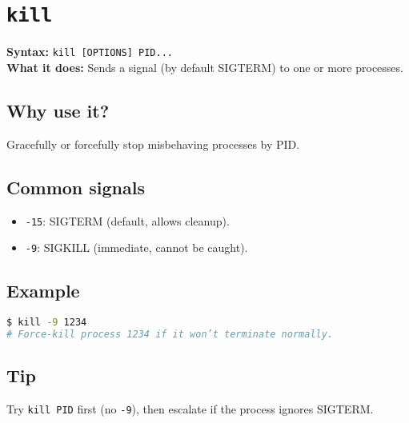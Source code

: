 \documentclass[10pt,oneside]{scrbook}
\begin{document}
\section{\texttt{kill}}
\begin{cmdbox}
  \textbf{Syntax:} \lstinline!kill [OPTIONS] PID...! \\
  \textbf{What it does:} Sends a signal (by default SIGTERM) to one or more processes.
\end{cmdbox}
\begin{commanddetails}
  \subsection*{Why use it?}
    Gracefully or forcefully stop misbehaving processes by PID.

  \subsection*{Common signals}
    \begin{itemize}
      \item \lstinline!-15!: SIGTERM (default, allows cleanup).  
      \item \lstinline!-9!: SIGKILL (immediate, cannot be caught).
    \end{itemize}

  \subsection*{Example}
  \begin{lstlisting}[language=bash]
$ kill -9 1234
# Force-kill process 1234 if it won’t terminate normally.
  \end{lstlisting}

  \subsection*{Tip}
    Try \lstinline!kill PID! first (no \lstinline!-9!), then escalate if the process ignores SIGTERM.
\end{commanddetails}

\end{document}
